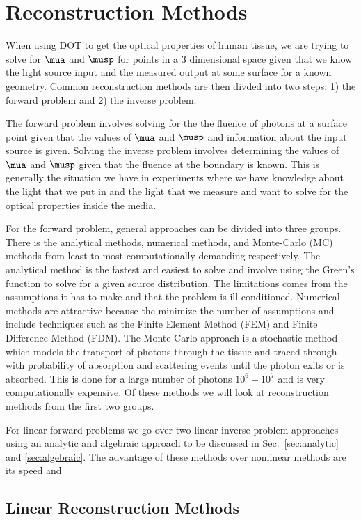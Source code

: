 \section{Reconstruction Methods}
When using DOT to get the optical properties of human tissue, we are trying to solve for $\mua$ and $\musp$ for points in a 3 dimensional space given that we know the light source input and the measured output at some surface for a known geometry. Common reconstruction methods are then divded into two steps: 1) the forward problem and 2) the inverse problem.

The forward problem involves solving for the the fluence of photons at a surface point given that the values of $\mua$ and $\musp$ and information about the input source is given. Solving the inverse problem involves determining the values of $\mua$ and $\musp$ given that the fluence at the boundary is known. This is generally the situation we have in experiments where we have knowledge about the light that we put in and the light that we measure and want to solve for the optical properties inside the media. 

For the forward problem, general approaches can be divided into three groups. There is the analytical methods, numerical methods, and Monte-Carlo (MC) methods from least to most computationally demanding respectively. The analytical method is the fastest and easiest to solve and involve using the Green's function to solve for a given source distribution. The limitations comes from the assumptions it has to make and that the problem is ill-conditioned. Numerical methods are attractive because the minimize the number of assumptions and include techniques such as the Finite Element Method (FEM) and Finite Difference Method (FDM). The Monte-Carlo approach is a stochastic method which models the transport of photons through the tissue and traced through with probability of absorption and scattering events until the photon exits or is absorbed. This is done for a large number of photons $10^6-10^7$ and is very computationally expensive. Of these methods we will look at reconstruction methods from the first two groups.

For linear forward problems we go over two linear inverse problem approaches using an analytic and algebraic approach to be discussed in Sec.~\ref{sec:analytic} and \ref{sec:algebraic}. The advantage of these methods over nonlinear methods are its speed and 




\subsection{Linear Reconstruction Methods}
\label{sec:linearrecon}



